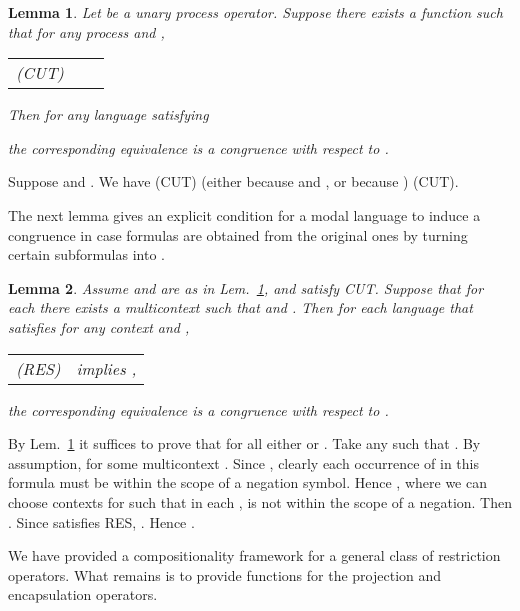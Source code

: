 \documentclass{eptcs}
\newtheorem{lemm}{Lemma}
\newenvironment{lemma}{\begin{lemm} \rm }{\end{lemm}}
\newenvironment{proof}{\begin{trivlist} \item[\hspace{\labelsep}\bf Proof:]}{\hfill  \end{trivlist}}
\begin{document}
\begin{lemma}
\label{lem:cut1} Let  be a unary process operator. Suppose there exists a function   such that for any process  and ,
\begin{center}
\begin{tabular}{l l}
(CUT)~~ & \\
\end{tabular}
\end{center}
Then for any language  satisfying
\begin{center}

\end{center}
the corresponding equivalence  is a congruence with respect to .
\end{lemma}
\begin{proof} Suppose  and . We have
 (CUT)  (either because  and , or because )  (CUT).
\end{proof}
The next lemma gives an explicit condition for a modal language to induce a congruence in case  formulas are obtained from the original ones by turning certain subformulas  into .

\begin{lemma}
\label{lem:cut2}
Assume  and  are as in Lem.~\ref{lem:cut1}, and satisfy CUT. Suppose that for each  there exists a multicontext  such that 
 and .
Then for each language  that satisfies for any context  and ,
\begin{center}
\begin{tabular}{l l}
(RES) &  implies ,
\end{tabular}
\end{center}
the corresponding equivalence  is a congruence with respect to .
\end{lemma}
\begin{proof} By Lem.\ \ref{lem:cut1} it suffices to prove that for all  either  or . Take any  such that . By assumption,  for some multicontext . Since , clearly each occurrence of  in this formula must be within the scope of a negation symbol.
Hence , where we can choose contexts  for  such that in each ,  is not within the scope of a negation.
Then . Since  satisfies RES, . Hence .
\end{proof}
We have provided a compositionality framework for a general class of restriction operators. What remains is to provide  functions for the projection and encapsulation operators.
\end{document}
